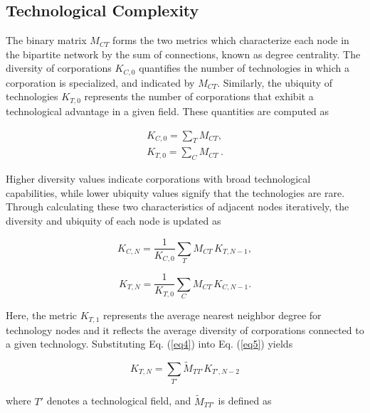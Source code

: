\subsection*{Technological Complexity}
{}
\label{subsection:technologicalcomplexity}
The binary matrix \(M_{CT}\) forms the two metrics which characterize each node in the bipartite network by the sum of connections, known as degree centrality. The diversity of corporations \(K_{C,0}\) quantifies the number of technologies in which a corporation is specialized, and indicated by $M_{CT}$. 
Similarly, the ubiquity of technologies \(K_{T,0}\) represents the number of corporations that exhibit a technological advantage in a given field. These quantities are computed as

\begin{equation}\label{eq3}
\begin{aligned}
K_{C,0} = \sum_{T} M_{CT},  \\
K_{T,0} = \sum_{C} M_{CT}~.
\end{aligned}
\end{equation}

Higher diversity values indicate corporations with broad technological capabilities, while lower ubiquity values signify that the technologies are rare. 
Through calculating these two characteristics of adjacent nodes iteratively, the diversity and ubiquity of each node is updated as

\begin{equation}\label{eq4}
K_{C,N} = \frac{1}{K_{C,0}} \sum_{T} M_{CT}\, K_{T,N-1},
\end{equation}

\begin{equation} \label{eq5}
K_{T,N} = \frac{1}{K_{T,0}} \sum_{C} M_{CT}\, K_{C,N-1}.
\end{equation}

Here, the metric \(K_{T,1}\) represents the average nearest neighbor degree for technology nodes and it reflects the average diversity of corporations connected to a given technology.
Substituting Eq. (\ref{eq4}) into Eq. (\ref{eq5}) yields

\begin{equation} \label{eq6}
K_{T,N} = \sum_{T'} \widetilde{M}_{TT'} K_{T',N-2}
\end{equation}

where \(T'\) denotes a technological field, and $\widetilde{M}_{TT'}$ is defined as

